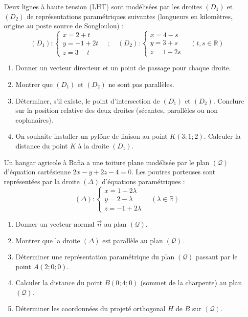 \documentclass[11pt]{article}
\begin{document}
\begin{exercice}
Deux lignes à haute tension (LHT) sont modélisées par les droites $(D_1)$ et $(D_2)$ de représentations paramétriques suivantes (longueurs en kilomètres, origine au poste source de Songloulou) :
\[
(D_1) : \begin{cases} x = 2 + t \\ y = -1 + 2t \\ z = 3 - t \end{cases} \quad ; \quad (D_2) : \begin{cases} x = 4 - s \\ y = 3 + s \\ z = 1 + 2s \end{cases} \quad (t, s \in \mathbb{R})
\]
\begin{enumerate}
    \item Donner un vecteur directeur et un point de passage pour chaque droite.
    \item Montrer que $(D_1)$ et $(D_2)$ ne sont pas parallèles.
    \item Déterminer, s'il existe, le point d'intersection de $(D_1)$ et $(D_2)$. Conclure sur la position relative des deux droites (sécantes, parallèles ou non coplanaires).
    \item On souhaite installer un pylône de liaison au point $K(3; 1; 2)$. Calculer la distance du point $K$ à la droite $(D_1)$.
\end{enumerate}
\end{exercice}

\begin{exercice}
Un hangar agricole à Bafia a une toiture plane modélisée par le plan $(\mathcal{Q})$ d'équation cartésienne $2x - y + 2z - 4 = 0$. Les poutres porteuses sont représentées par la droite $(\Delta)$ d'équations paramétriques :
\[
(\Delta) : \begin{cases} x = 1 + 2\lambda \\ y = 2 - \lambda \\ z = -1 + 2\lambda \end{cases} \quad (\lambda \in \mathbb{R})
\]
\begin{enumerate}
    \item Donner un vecteur normal $\vec{n}$ au plan $(\mathcal{Q})$.
    \item Montrer que la droite $(\Delta)$ est parallèle au plan $(\mathcal{Q})$.
    \item Déterminer une représentation paramétrique du plan $(\mathcal{Q})$ passant par le point $A(2; 0; 0)$.
    \item Calculer la distance du point $B(0; 4; 0)$ (sommet de la charpente) au plan $(\mathcal{Q})$.
    \item Déterminer les coordonnées du projeté orthogonal $H$ de $B$ sur $(\mathcal{Q})$.
\end{enumerate}
\end{exercice}
\end{document}
